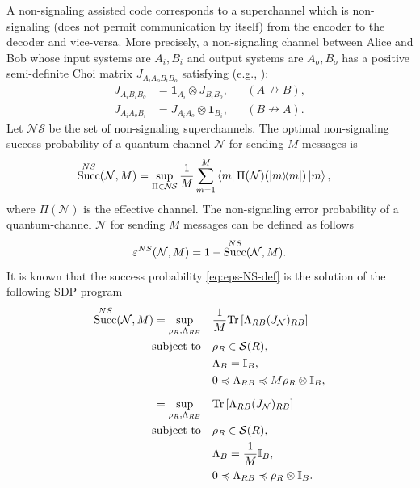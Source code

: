 \documentclass[a4paper,onecolumn,11pt,accepted=2025-10-01]{quantumarticle}
\DeclareMathOperator{\suc}{Succ}
\newcommand*{\bid}{\mathbf{1}}
\newcommand*{\cN}{\mathcal{N}}
\newcommand*{\cS}{\mathcal{S}}
\newcommand*{\eps}{\varepsilon}
\newcommand*{\tr}[1]{\mathrm{Tr}\left[#1\right]}
\newcommand*{\proj}[1]{|#1\rangle\!\langle #1|}
\newcommand*{\mle}{\preccurlyeq}
\begin{document}
A non-signaling assisted code corresponds to a superchannel which is non-signaling (does not permit communication by itself) from the encoder to the decoder and vice-versa. More precisely, a non-signaling channel between Alice and Bob whose input systems are $A_i, B_i$ and output systems are $A_o, B_o$ has a  positive semi-definite Choi matrix $J_{A_iA_oB_iB_o}$ satisfying (e.g., \cite{Fang2019Sep}):
\begin{align}
    J_{A_iB_iB_o}  &= \bid_{A_i} \otimes J_{B_iB_o}, &&(A\nrightarrow B), 
    \\J_{A_iA_oB_i}  &= J_{A_iA_o}\otimes \bid_{B_i},  &&(B\nrightarrow A). 
\end{align}
Let $\cN\!\cS$ be the set of non-signaling superchannels. The optimal non-signaling success probability of a quantum-channel $\cN$ for sending $M$ messages is 
\begin{align}\label{eq:eps-NS-def}
     \suc^{\rm{NS}}(\cN, M) 
     &=\sup_{\Pi \in \cN\!\cS}  \frac{1}{M} \sum_{m=1}^M \bra{m}\Pi (\cN) (\proj{m}) \ket{m},
\end{align}
where $\Pi (\cN)$ is the effective channel. 
The non-signaling error probability of a quantum-channel $\cN$ for sending $M$ messages can be defined as follows
\begin{equation}\label{eq:def-NS-err}
    \eps^{\rm{NS}}(\cN, M) = 1-\suc^{\rm{NS}}(\cN, M).
\end{equation}
It is known that the success probability \eqref{eq:eps-NS-def} is the solution of the following SDP program \cite{Matthews2014Sep,Wang2019Feb}
\begin{align}
\suc^{\rm{NS}}(\cN, M) = \sup_{\rho_R, \Lambda_{RB}} \quad & \frac{1}{M} \tr{\Lambda_{RB} (J_{\cN})_{RB}} \notag \\
\text{subject to} \quad
& \rho_R \in \cS(R), \notag \\
& \Lambda_B = \mathbb{I}_B, \notag \\
& 0 \mle \Lambda_{RB} \mle M \rho_R \otimes \mathbb{I}_B, \label{NS-program-pre}
\\[6pt]
= \sup_{\rho_R, \Lambda_{RB}} \quad & \tr{\Lambda_{RB} (J_{\cN})_{RB}} \notag \\
\text{subject to} \quad
& \rho_R \in \cS(R), \notag \\
& \Lambda_B = \frac{1}{M} \mathbb{I}_B, \notag \\
& 0 \mle \Lambda_{RB} \mle \rho_R \otimes \mathbb{I}_B. \label{NS-program}
\end{align}
\end{document}
